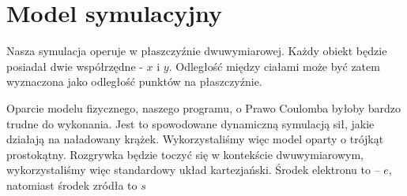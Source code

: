 \documentclass{article}
\begin{document}
\clearpage

\section{Model symulacyjny}

Nasza symulacja operuje w płaszczyźnie dwuwymiarowej. Każdy obiekt będzie posiadał dwie współrzędne - $x$ i $y$. Odległość między ciałami może być zatem wyznaczona jako odległość punktów na płaszczyźnie.

\iffalse
Oparcie modelu fizycznego, naszego programu, o Prawo Coulomba byłoby bardzo trudne do wykonania. Jest to spowodowane dynamiczną symulacją sił, jakie działają na naładowany krążek. Wykorzystaliśmy więc model oparty o trójkąt prostokątny. Rozgrywka będzie toczyć się w kontekście dwuwymiarowym, wykorzystaliśmy więc standardowy układ kartezjański. 
Środek elektronu to – \textbf{$e$}, natomiast środek zródła to \textbf{$s$}




\end{document}
